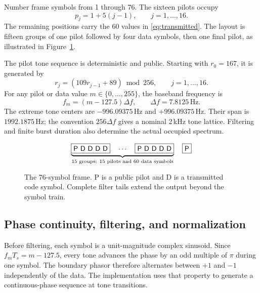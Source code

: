 \documentclass[11pt,a4paper]{article}
\newcommand{\Hz}{\,\mathrm{Hz}}
\begin{document}
Number frame symbols from 1 through 76. The sixteen pilots occupy
\begin{equation}
  p_j=1+5(j-1),\qquad j=1,\ldots,16.
  \label{eq:pilotpositions}
\end{equation}
The remaining positions carry the 60 values in \eqref{eq:transmitted}.
The layout is fifteen groups of one pilot followed by four data symbols,
then one final pilot, as illustrated in Figure~\ref{fig:frame}.

The pilot tone sequence is deterministic and public. Starting with
$r_0=167$, it is generated by
\begin{equation}
  r_j=(109r_{j-1}+89)\bmod256,\qquad j=1,\ldots,16.
\end{equation}
For any pilot or data value $m\in\{0,\ldots,255\}$, the baseband frequency is
\begin{equation}
  f_m=(m-127.5)\Delta f,\qquad \Delta f=7.8125\Hz.
  \label{eq:tones}
\end{equation}
The extreme tone centers are $-996.09375\Hz$ and $+996.09375\Hz$. Their
span is $1992.1875\Hz$; the convention $256\Delta f$ gives a nominal
2\,kHz tone lattice. Filtering and finite burst duration also determine
the actual occupied spectrum.

\begin{figure}[ht]
\centering
\setlength{\fboxsep}{8pt}
\[
\underbrace{\fbox{\textsf{P D D D D}}\quad\cdots\quad
             \fbox{\textsf{P D D D D}}}_{\text{15 groups: 15 pilots and 60 data symbols}}
\quad\fbox{\textsf{P}}
\]
\caption{The 76-symbol frame. P is a public pilot and D is a transmitted
code symbol. Complete filter tails extend the output beyond the symbol train.}
\label{fig:frame}
\end{figure}

\subsection{Phase continuity, filtering, and normalization}

Before filtering, each symbol is a unit-magnitude complex sinusoid. Since
$f_mT_s=m-127.5$, every tone advances the phase by an odd multiple of
$\pi$ during one symbol. The boundary phasor therefore alternates between
$+1$ and $-1$ independently of the data. The implementation uses that
property to generate a continuous-phase sequence at tone transitions.
\end{document}
